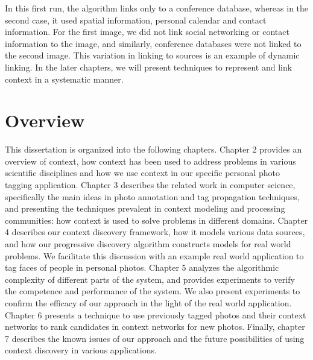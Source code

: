 In this first run, the algorithm links only to a conference database, whereas in the second case, it used spatial information, personal calendar and contact information. For the first image, we did not link social networking or contact information to the image, and similarly, conference databases were not linked to the second image. This variation in linking to sources is an example of dynamic linking. In the later chapters, we will present techniques to represent and link context in a systematic manner.

\section{Overview}
This dissertation is organized into the following chapters. Chapter 2 provides an overview of context, how context has been used to address problems in various scientific disciplines and how we use context in our specific personal photo tagging application. Chapter 3 describes the related work in computer science, specifically the main ideas in photo annotation and tag propagation techniques, and presenting the techniques prevalent in context modeling and processing communities: how context is used to solve problems in different domains. Chapter 4 describes our context discovery framework, how it models various data sources, and how our progressive discovery algorithm constructs models for real world problems. We facilitate this discussion with an example real world application to tag faces of people in personal photos. Chapter 5 analyzes the algorithmic complexity of different parts of the system, and provides experiments to verify the competence and performance of the system. We also present experiments to confirm the efficacy of our approach in the light of the real world application. Chapter 6 presents a technique to use previously tagged photos and their context networks to rank candidates in context networks for new photos. Finally, chapter 7 describes the known issues of our approach and the future possibilities of using context discovery in various applications.



